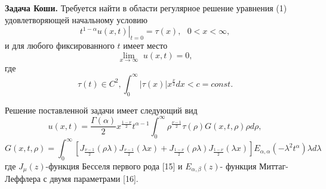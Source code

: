 \textbf{Задача Коши.} Требуется найти в области   регулярное решение уравнения (1) удовлетворяющей начальному условию 
\begin{equation} \label{GrindEQ__4_} 
\left. t^{1-\alpha } u\left(x,t\right)\right|_{t=0} =\tau \left(x\right),\, \, \, \, 0<x<\infty , 
\end{equation} 
и для любого фиксированного  $t$ имеет место 
\begin{equation} \label{GrindEQ__5_} 
{\mathop{\lim }\limits_{x\to \infty }} \, \, u\left(x,t\right)=0, 
\end{equation} 
где
\[\tau \left(t\right)\in C^{2} , \int _{0}^{\infty } \left|\tau \left(x\right)\right|x^{\frac{\nu }{2} } dx<c=const.\] 

Решение поставленной задачи имеет следующий вид
\begin{equation} \label{GrindEQ__6_} {u\left(x,t\right)=\frac{\Gamma \left(\alpha \right)}{2} x^{\frac{1-\nu }{2} } t^{\alpha -1} \int _{0}^{\infty } \rho ^{\frac{\nu -1}{2} } \tau \left(\rho \right)G\left(x,t,\rho \right)\rho d\rho ,} \end{equation} 
\[ {G\left(x,t,\rho \right)=\int _{0}^{\infty } \left[J_{\frac{\nu -1}{2} } \left(\rho \lambda \right)J_{\frac{\nu -1}{2} } \left(\lambda x\right)+J_{\frac{1-\nu }{2} } \left(\rho \lambda \right)J_{\frac{1-\nu }{2} } \left(\lambda x\right)\right]E_{\alpha ,\alpha } \left(-\lambda ^{2} t^{\alpha } \right)\lambda d\lambda } \]
где $J_{\mu } \left(z\right)$-функция Бесселя первого рода [15] и $E_{\alpha ,\beta } \left(z\right)$- функция Миттаг-Леффлера с двумя параметрами [16].







